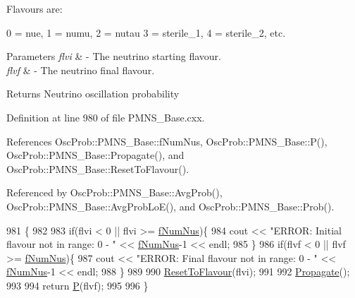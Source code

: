Flavours are\+: 
\begin{DoxyPre}
  0 = nue, 1 = numu, 2 = nutau
  3 = sterile\_1, 4 = sterile\_2, etc.
\end{DoxyPre}
 
\begin{DoxyParams}{Parameters}
{\em flvi} & -\/ The neutrino starting flavour. \\
\hline
{\em flvf} & -\/ The neutrino final flavour.\\
\hline
\end{DoxyParams}
\begin{DoxyReturn}{Returns}
Neutrino oscillation probability 
\end{DoxyReturn}


Definition at line 980 of file P\+M\+N\+S\+\_\+\+Base.\+cxx.



References Osc\+Prob\+::\+P\+M\+N\+S\+\_\+\+Base\+::f\+Num\+Nus, Osc\+Prob\+::\+P\+M\+N\+S\+\_\+\+Base\+::\+P(), Osc\+Prob\+::\+P\+M\+N\+S\+\_\+\+Base\+::\+Propagate(), and Osc\+Prob\+::\+P\+M\+N\+S\+\_\+\+Base\+::\+Reset\+To\+Flavour().



Referenced by Osc\+Prob\+::\+P\+M\+N\+S\+\_\+\+Base\+::\+Avg\+Prob(), Osc\+Prob\+::\+P\+M\+N\+S\+\_\+\+Base\+::\+Avg\+Prob\+Lo\+E(), and Osc\+Prob\+::\+P\+M\+N\+S\+\_\+\+Base\+::\+Prob().


\begin{DoxyCode}
981 \{
982 
983   \textcolor{keywordflow}{if}(flvi < 0 || flvi >= \hyperlink{classOscProb_1_1PMNS__Base_a24bb74bed63569dfe88b18fa6a08060e}{fNumNus})\{
984     cout << \textcolor{stringliteral}{"ERROR: Initial flavour not in range: 0 - "} << \hyperlink{classOscProb_1_1PMNS__Base_a24bb74bed63569dfe88b18fa6a08060e}{fNumNus}-1 << endl;
985   \}
986   \textcolor{keywordflow}{if}(flvf < 0 || flvf >= \hyperlink{classOscProb_1_1PMNS__Base_a24bb74bed63569dfe88b18fa6a08060e}{fNumNus})\{
987     cout << \textcolor{stringliteral}{"ERROR: Final flavour not in range: 0 - "} << \hyperlink{classOscProb_1_1PMNS__Base_a24bb74bed63569dfe88b18fa6a08060e}{fNumNus}-1 << endl;
988   \}
989 
990   \hyperlink{classOscProb_1_1PMNS__Base_ac0d4bf8ff1318ef96d3dafa62e0cec25}{ResetToFlavour}(flvi);
991 
992   \hyperlink{classOscProb_1_1PMNS__Base_a054e3a8b05b9a958b6fa416e4a835e3e}{Propagate}();
993 
994   \textcolor{keywordflow}{return} \hyperlink{classOscProb_1_1PMNS__Base_a0dc4d45bc3d7e03b9abbf5b4e100cc22}{P}(flvf);
995 
996 \}
\end{DoxyCode}
